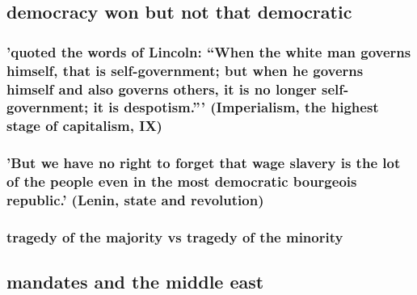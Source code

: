 \documentclass[letterpaper]{article}
\begin{document}
\subsection{democracy won but not that democratic}
\label{sec:org3c62086}
\subsubsection{'quoted the words of Lincoln: “When the white man governs himself, that is self-government; but when he governs himself and also governs others, it is no longer self-government; it is despotism.”' (Imperialism, the highest stage of capitalism, IX)}
\label{sec:orgf6aa8ff}
\subsubsection{'But we have no right to forget that wage slavery is the lot of the people even in the most democratic bourgeois republic.' (Lenin, state and revolution)}
\label{sec:org5a91639}
\subsubsection{tragedy of the majority vs tragedy of the minority}
\label{sec:orgaf65e61}
\subsection{mandates and the middle east}
\label{sec:org61df1e3}
\end{document}
